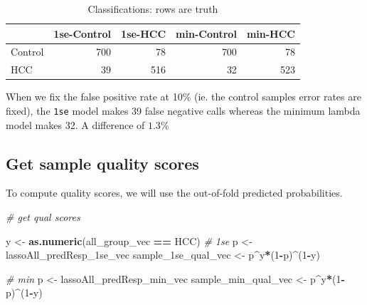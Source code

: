 \documentclass[
]{book}
\newenvironment{Shaded}{\begin{snugshade}}{\end{snugshade}}
\newcommand{\CommentTok}[1]{\textcolor[rgb]{0.56,0.35,0.01}{\textit{#1}}}
\newcommand{\DecValTok}[1]{\textcolor[rgb]{0.00,0.00,0.81}{#1}}
\newcommand{\KeywordTok}[1]{\textcolor[rgb]{0.13,0.29,0.53}{\textbf{#1}}}
\newcommand{\NormalTok}[1]{#1}
\newcommand{\OperatorTok}[1]{\textcolor[rgb]{0.81,0.36,0.00}{\textbf{#1}}}
\newcommand{\StringTok}[1]{\textcolor[rgb]{0.31,0.60,0.02}{#1}}
\begin{document}
\begin{table}

\caption{\label{tab:get-sample-class}Classifications: rows are truth}
\centering
\begin{tabular}[t]{l|r|r|r|r}
\hline
  & 1se-Control & 1se-HCC & min-Control & min-HCC\\
\hline
Control & 700 & 78 & 700 & 78\\
\hline
HCC & 39 & 516 & 32 & 523\\
\hline
\end{tabular}
\end{table}

When we fix the false positive rate at 10\% (ie. the control samples error rates are fixed),
the \texttt{1se} model makes 39 false negative calls whereas the minimum lambda model makes 32. A difference
of \(1.3\)\%

\hypertarget{get-sample-quality-scores}{%
\subsection*{Get sample quality scores}\label{get-sample-quality-scores}}

To compute quality scores, we will use the out-of-fold predicted probabilities.

\begin{Shaded}
\begin{Highlighting}[]
\CommentTok{\# get qual scores}

\NormalTok{y <{-}}\StringTok{ }\KeywordTok{as.numeric}\NormalTok{(all\_group\_vec }\OperatorTok{==}\StringTok{ \textquotesingle{}HCC\textquotesingle{}}\NormalTok{)}
\CommentTok{\# 1se}
\NormalTok{p <{-}}\StringTok{ }\NormalTok{lassoAll\_predResp\_1se\_vec}
\NormalTok{sample\_1se\_qual\_vec <{-}}\StringTok{ }\NormalTok{p}\OperatorTok{\^{}}\NormalTok{y}\OperatorTok{*}\NormalTok{(}\DecValTok{1}\OperatorTok{{-}}\NormalTok{p)}\OperatorTok{\^{}}\NormalTok{(}\DecValTok{1}\OperatorTok{{-}}\NormalTok{y)}

\CommentTok{\# min}
\NormalTok{p <{-}}\StringTok{ }\NormalTok{lassoAll\_predResp\_min\_vec}
\NormalTok{sample\_min\_qual\_vec <{-}}\StringTok{ }\NormalTok{p}\OperatorTok{\^{}}\NormalTok{y}\OperatorTok{*}\NormalTok{(}\DecValTok{1}\OperatorTok{{-}}\NormalTok{p)}\OperatorTok{\^{}}\NormalTok{(}\DecValTok{1}\OperatorTok{{-}}\NormalTok{y)}
\end{Highlighting}
\end{Shaded}
\end{document}

